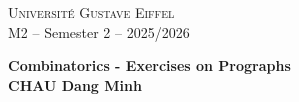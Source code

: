 \documentclass[11pt,a4paper]{article}
\begin{document}
\begin{center}

  \textsc{Universit\'e Gustave Eiffel} \hfill  \,\\
  M2 -- Semester 2 -- 2025/2026 \hfill \, \\
  \bigskip

  {\bf
    \vspace{0.9cm}
    \Large Combinatorics - Exercises on Prographs\\
    \vspace{0.2cm}
    \normalsize CHAU Dang Minh
  }
\end{center}
\bigskip

\vspace{0.5cm}


\printbibliography
\end{document}
